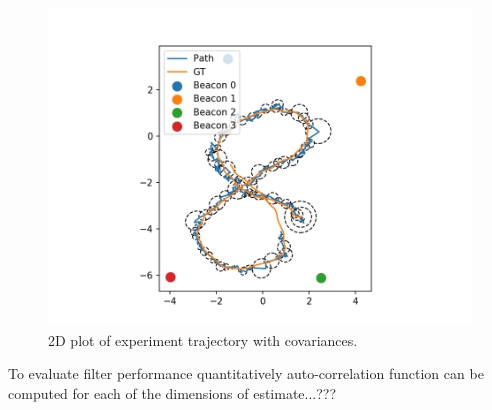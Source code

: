 \begin{figure}[H]
    \centering
    \includegraphics[width=\linewidth]{figures/2d_with_cov.png}
    \caption{2D plot of experiment trajectory with covariances.}
    \label{fig:exp_2d_path_covariances}
\end{figure}

To evaluate filter performance quantitatively auto-correlation function can be computed for each of the dimensions of estimate...???



